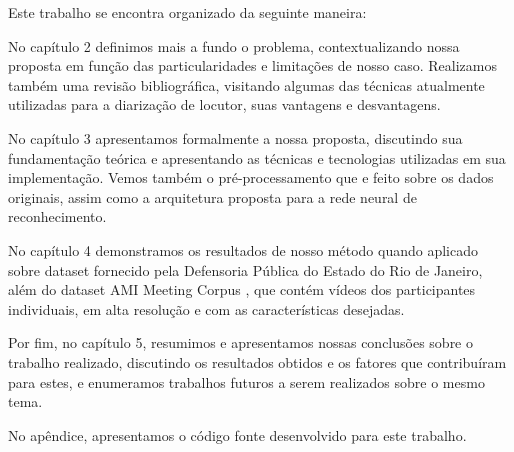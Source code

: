 Este trabalho se encontra organizado da seguinte maneira:


No capítulo 2 definimos mais a fundo o problema, contextualizando nossa proposta em função das particularidades e limitações de nosso caso.
Realizamos também uma revisão bibliográfica, visitando algumas das técnicas atualmente utilizadas para a diarização de locutor, suas vantagens e desvantagens.

No capítulo 3 apresentamos formalmente a nossa proposta, discutindo sua fundamentação teórica e apresentando as técnicas e tecnologias utilizadas em sua implementação.
Vemos também o pré-processamento que e feito sobre os dados originais, assim como a arquitetura proposta para a rede neural de reconhecimento.

No capítulo 4 demonstramos os resultados de nosso método quando aplicado sobre dataset fornecido pela Defensoria Pública do Estado do Rio de Janeiro, além do dataset AMI Meeting Corpus \cite{mccowanAMIMeetingCorpus2005}, que contém vídeos dos participantes individuais, em alta resolução e com as características desejadas.

Por fim, no capítulo 5, resumimos e apresentamos nossas conclusões sobre o trabalho realizado, discutindo os resultados obtidos e os fatores que contribuíram para estes, e enumeramos trabalhos futuros a serem realizados sobre o mesmo tema.

No apêndice, apresentamos o código fonte desenvolvido para este trabalho.